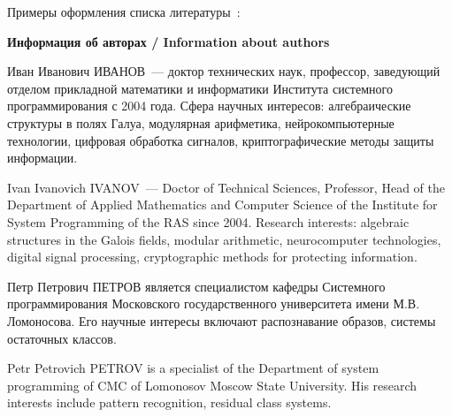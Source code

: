 \documentclass{ProcISPRAS}
\begin{document}
Примеры оформления списка литературы~\cite{ermakov15, chervyakov17,
proskuryakova17, burgess03, naveh07, dijkstra76, un210-kit, akushsky68}:

\begin{otherlanguage}{english}
\printbibliography
\end{otherlanguage}

{\vskip 12pt\normalfont\sffamily\bfseries\large Информация об авторах / Information about authors}
\setlength{\parskip}{6pt}

Иван Иванович ИВАНОВ~--- доктор технических наук, профессор, заведующий отделом
прикладной математики и информатики Института системного программирования с 2004
года. Сфера научных интересов: алгебраические структуры в полях Галуа,
модулярная арифметика, нейрокомпьютерные технологии, цифровая обработка
сигналов, криптографические методы защиты информации.

Ivan Ivanovich IVANOV~--- Doctor of Technical Sciences, Professor, Head of the
Department of Applied Mathematics and Computer Science of the Institute for
System Programming of the RAS since 2004. Research interests: algebraic
structures in the Galois fields, modular arithmetic, neurocomputer technologies,
digital signal processing, cryptographic methods for protecting information.

Петр Петрович ПЕТРОВ является специалистом кафедры Системного программирования
Московского государственного университета имени М.В. Ломоносова. Его научные
интересы включают распознавание образов, системы остаточных классов.

Petr Petrovich PETROV is a specialist of the Department of system programming of
CMC of Lomonosov Moscow State University. His research interests include pattern
recognition, residual class systems.
\end{document}
